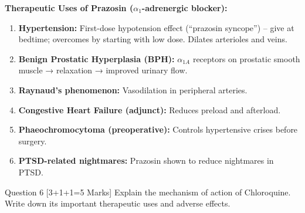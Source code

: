 \documentclass[11pt,a4paper]{article}
\begin{document}
\begin{ansbox}
\textbf{Therapeutic Uses of Prazosin ($\alpha_1$-adrenergic blocker):}
\begin{enumerate}[leftmargin=*]
    \item \textbf{Hypertension:} First-dose hypotension effect (``prazosin syncope'') -- give at bedtime; overcomes by starting with low dose. Dilates arterioles and veins.
    \item \textbf{Benign Prostatic Hyperplasia (BPH):} $\alpha_{1A}$ receptors on prostatic smooth muscle → relaxation → improved urinary flow.
    \item \textbf{Raynaud's phenomenon:} Vasodilation in peripheral arteries.
    \item \textbf{Congestive Heart Failure (adjunct):} Reduces preload and afterload.
    \item \textbf{Phaeochromocytoma (preoperative):} Controls hypertensive crises before surgery.
    \item \textbf{PTSD-related nightmares:} Prazosin shown to reduce nightmares in PTSD.
\end{enumerate}
\end{ansbox}

\begin{qbox}{Question 6 [3+1+1=5 Marks]}
Explain the mechanism of action of Chloroquine. Write down its important therapeutic uses and adverse effects.
\end{qbox}
\end{document}
